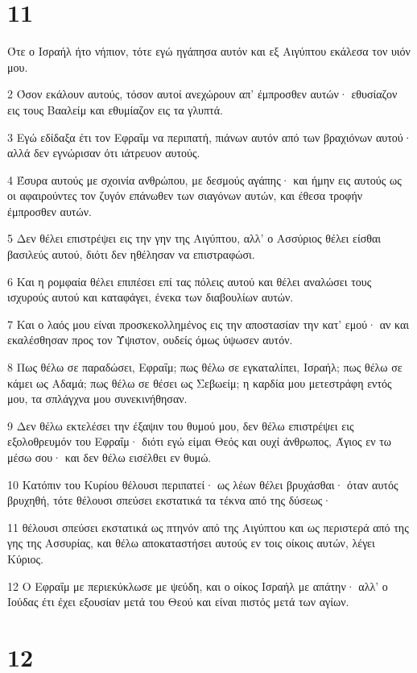 \chapter{11}

\par Ότε ο Ισραήλ ήτο νήπιον, τότε εγώ ηγάπησα αυτόν και εξ Αιγύπτου εκάλεσα τον υιόν μου.
\par 2 Όσον εκάλουν αυτούς, τόσον αυτοί ανεχώρουν απ' έμπροσθεν αυτών· εθυσίαζον εις τους Βααλείμ και εθυμίαζον εις τα γλυπτά.
\par 3 Εγώ εδίδαξα έτι τον Εφραΐμ να περιπατή, πιάνων αυτόν από των βραχιόνων αυτού· αλλά δεν εγνώρισαν ότι ιάτρευον αυτούς.
\par 4 Έσυρα αυτούς με σχοινία ανθρώπου, με δεσμούς αγάπης· και ήμην εις αυτούς ως οι αφαιρούντες τον ζυγόν επάνωθεν των σιαγόνων αυτών, και έθεσα τροφήν έμπροσθεν αυτών.
\par 5 Δεν θέλει επιστρέψει εις την γην της Αιγύπτου, αλλ' ο Ασσύριος θέλει είσθαι βασιλεύς αυτού, διότι δεν ηθέλησαν να επιστραφώσι.
\par 6 Και η ρομφαία θέλει επιπέσει επί τας πόλεις αυτού και θέλει αναλώσει τους ισχυρούς αυτού και καταφάγει, ένεκα των διαβουλίων αυτών.
\par 7 Και ο λαός μου είναι προσκεκολλημένος εις την αποστασίαν την κατ' εμού· αν και εκαλέσθησαν προς τον Ύψιστον, ουδείς όμως ύψωσεν αυτόν.
\par 8 Πως θέλω σε παραδώσει, Εφραΐμ; πως θέλω σε εγκαταλίπει, Ισραήλ; πως θέλω σε κάμει ως Αδαμά; πως θέλω σε θέσει ως Σεβωείμ; η καρδία μου μετεστράφη εντός μου, τα σπλάγχνα μου συνεκινήθησαν.
\par 9 Δεν θέλω εκτελέσει την έξαψιν του θυμού μου, δεν θέλω επιστρέψει εις εξολοθρευμόν του Εφραΐμ· διότι εγώ είμαι Θεός και ουχί άνθρωπος, Άγιος εν τω μέσω σου· και δεν θέλω εισέλθει εν θυμώ.
\par 10 Κατόπιν του Κυρίου θέλουσι περιπατεί· ως λέων θέλει βρυχάσθαι· όταν αυτός βρυχηθή, τότε θέλουσι σπεύσει εκστατικά τα τέκνα από της δύσεως·
\par 11 θέλουσι σπεύσει εκστατικά ως πτηνόν από της Αιγύπτου και ως περιστερά από της γης της Ασσυρίας, και θέλω αποκαταστήσει αυτούς εν τοις οίκοις αυτών, λέγει Κύριος.
\par 12 Ο Εφραΐμ με περιεκύκλωσε με ψεύδη, και ο οίκος Ισραήλ με απάτην· αλλ' ο Ιούδας έτι έχει εξουσίαν μετά του Θεού και είναι πιστός μετά των αγίων.

\chapter{12}

